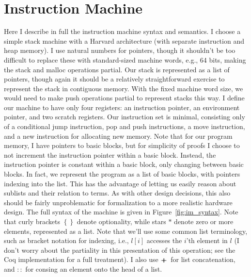 \section{Instruction Machine} \label{sec:im_semantics}

Here I describe in full the instruction machine syntax and semantics. I 
choose a simple stack machine with a Harvard architecture (with separate
instruction and heap memory). I use natural numbers for pointers, though it
shouldn't be too difficult to replace these with standard-sized machine words,
e.g., 64 bits, making the stack and malloc operations partial. Our stack is
represented as a list of pointers, though again it should be a relatively
straightforward exercise to represent the stack in contiguous memory. With the fixed
machine word size, we would need to make push operations partial to represent
stacks this way. I define our machine to have only four registers: an
instruction pointer, an environment pointer, and two scratch registers. Our
instruction set is minimal, consisting only of a conditional jump instruction,
pop and push instructions, a move instruction, and a new instruction for
allocating new memory. Note that for our program memory, I have pointers to
basic blocks, but for simplicity of proofs I choose to not increment the
instruction pointer within a basic block.  Instead, the instruction pointer is
constant within a basic block, only changing between basic blocks. In fact, we
represent the program as a list of basic blocks, with pointers indexing into the
list. This has the advantage of letting us easily reason about sublists and
their relation to terms. As with other design decisions, this also should be
fairly unproblematic for formalization to a more realistic hardware design. The
full syntax of the machine is given in Figure~\ref{fig:im_syntax}. Note that
curly brackets $\left\{\right\}$ denote optionality, while stars $*$ denote zero
or more elements, represented as a list. Note that we'll use some common list
terminology, such as bracket notation for indexing, i.e., $l\left[i\right]$ accesses the
$i$'th element in $l$ (I don't worry about the partiality in this presentation
of this operation; see the Coq implementation for a full treatment). I also use
$+\!\!\!\!+\,$ for list concatenation, and $::$ for consing an element onto the head
of a list. 

